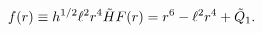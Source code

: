 \begin{equation}
f(r)\equiv h^{1/2}\ell^{2}r^{4}\tilde{H} F(r)\nonumber\\
=r^{6}-\ell^{2}r^{4}+\tilde{Q}_{1}.
\label{eq:pq1fr}
\end{equation}


